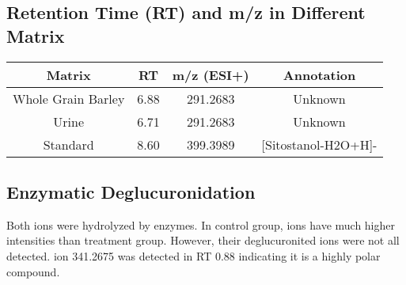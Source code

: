 \subsection{Retention Time (RT) and m/z in Different Matrix}
\begin{tabular}{|c|c|c|c|}
	\hline 
	Matrix & RT & m/z (ESI+) & Annotation \\ 
	\hline 
	Whole Grain Barley & 6.88 & 291.2683 & Unknown \\ 
	\hline 
	Urine & 6.71 & 291.2683 & Unknown \\ 
	\hline 
	Standard & 8.60 & 399.3989 & [Sitostanol-H2O+H]- \\ 
	\hline 
\end{tabular} 

\subsection{Enzymatic Deglucuronidation}
Both ions were hydrolyzed by enzymes. 
In control group, ions have much higher intensities than treatment group.
However, their deglucuronited ions were not all detected.
ion 341.2675 was detected in RT 0.88 indicating it is a highly polar compound.

\subsection{}

